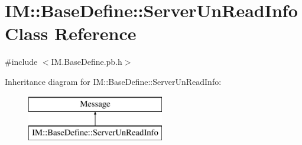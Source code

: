 \hypertarget{class_i_m_1_1_base_define_1_1_server_un_read_info}{}\section{I\+M\+:\+:Base\+Define\+:\+:Server\+Un\+Read\+Info Class Reference}
\label{class_i_m_1_1_base_define_1_1_server_un_read_info}


{\ttfamily \#include $<$I\+M.\+Base\+Define.\+pb.\+h$>$}

Inheritance diagram for I\+M\+:\+:Base\+Define\+:\+:Server\+Un\+Read\+Info\+:\begin{figure}[H]
\begin{center}
\leavevmode
\includegraphics[height=2.000000cm]{class_i_m_1_1_base_define_1_1_server_un_read_info}
\end{center}
\end{figure}
